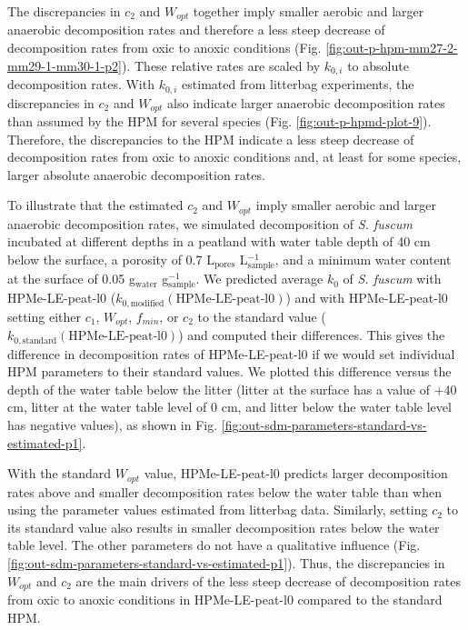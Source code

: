 \documentclass[
  12pt,
]{article}
\begin{document}
The discrepancies in \(c_2\) and \(W_{opt}\) together imply smaller aerobic and larger anaerobic decomposition rates and therefore a less steep decrease of decomposition rates from oxic to anoxic conditions (Fig. \ref{fig:out-p-hpm-mm27-2-mm29-1-mm30-1-p2}). These relative rates are scaled by \(k_{0,i}\) to absolute decomposition rates. With \(k_{0,i}\) estimated from litterbag experiments, the discrepancies in \(c_2\) and \(W_{opt}\) also indicate larger anaerobic decomposition rates than assumed by the HPM for several species (Fig. \ref{fig:out-p-hpmd-plot-9}). Therefore, the discrepancies to the HPM indicate a less steep decrease of decomposition rates from oxic to anoxic conditions and, at least for some species, larger absolute anaerobic decomposition rates.

To illustrate that the estimated \(c_2\) and \(W_{opt}\) imply smaller aerobic and larger anaerobic decomposition rates, we simulated decomposition of \emph{S. fuscum} incubated at different depths in a peatland with water table depth of 40 cm below the surface, a porosity of 0.7 L\(_\text{pores}\) L\(_\text{sample}^{-1}\), and a minimum water content at the surface of 0.05 g\(_\text{water}\) g\(_\text{sample}^{-1}\). We predicted average \(k_0\) of \emph{S. fuscum} with HPMe-LE-peat-l0 (\(k_{0,\text{modified}}(\text{HPMe-LE-peat-l0})\)) and with HPMe-LE-peat-l0 setting either \(c_1\), \(W_{opt}\), \(f_{min}\), or \(c_2\) to the standard value (\(k_{0,\text{standard}}(\text{HPMe-LE-peat-l0})\)) and computed their differences. This gives the difference in decomposition rates of HPMe-LE-peat-l0 if we would set individual HPM parameters to their standard values. We plotted this difference versus the depth of the water table below the litter (litter at the surface has a value of +40 cm, litter at the water table level of 0 cm, and litter below the water table level has negative values), as shown in Fig. \ref{fig:out-sdm-parameters-standard-vs-estimated-p1}.

With the standard \(W_{opt}\) value, HPMe-LE-peat-l0 predicts larger decomposition rates above and smaller decomposition rates below the water table than when using the parameter values estimated from litterbag data. Similarly, setting \(c_2\) to its standard value also results in smaller decomposition rates below the water table level. The other parameters do not have a qualitative influence (Fig. \ref{fig:out-sdm-parameters-standard-vs-estimated-p1}). Thus, the discrepancies in \(W_{opt}\) and \(c_2\) are the main drivers of the less steep decrease of decomposition rates from oxic to anoxic conditions in HPMe-LE-peat-l0 compared to the standard HPM.
\end{document}
